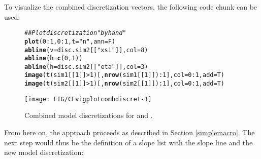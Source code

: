 \documentclass[article,nojss]{jss}\usepackage[]{graphicx}\usepackage[]{xcolor}
\makeatletter
\def\maxwidth{ %
  \ifdim\Gin@nat@width>\linewidth
    \linewidth
  \else
    \Gin@nat@width
  \fi
}
\newcommand{\hlnum}[1]{\textcolor[rgb]{0.686,0.059,0.569}{#1}}%
\newcommand{\hlsng}[1]{\textcolor[rgb]{0.192,0.494,0.8}{#1}}%
\newcommand{\hlcom}[1]{\textcolor[rgb]{0.678,0.584,0.686}{\textit{#1}}}%
\newcommand{\hlopt}[1]{\textcolor[rgb]{0,0,0}{#1}}%
\newcommand{\hldef}[1]{\textcolor[rgb]{0.345,0.345,0.345}{#1}}%
\newcommand{\hlkwc}[1]{\textcolor[rgb]{0.333,0.667,0.333}{#1}}%
\newcommand{\hlkwd}[1]{\textcolor[rgb]{0.737,0.353,0.396}{\textbf{#1}}}%
\newenvironment{kframe}{%
 \def\at@end@of@kframe{}%
 \ifinner\ifhmode%
  \def\at@end@of@kframe{\end{minipage}}%
  \begin{minipage}{\columnwidth}%
 \fi\fi%
 \def\FrameCommand##1{\hskip\@totalleftmargin \hskip-\fboxsep
 \colorbox{shadecolor}{##1}\hskip-\fboxsep
     \hskip-\linewidth \hskip-\@totalleftmargin \hskip\columnwidth}%
 \MakeFramed {\advance\hsize-\width
   \@totalleftmargin\z@ \linewidth\hsize
   \@setminipage}}%
 {\par\unskip\endMakeFramed%
 \at@end@of@kframe}
\newenvironment{knitrout}{}{} %
\makeatother
\begin{document}
To visualize the combined discretization vectors, the following code chunk can be used:

\begin{figure}[h]
\begin{center}
\begin{knitrout}
\color{fgcolor}\begin{kframe}
\begin{alltt}
 \hlcom{## Plot discretization "by hand"}
  \hlkwd{plot}\hldef{(}\hlnum{0}\hlopt{:}\hlnum{1}\hldef{,}\hlnum{0}\hlopt{:}\hlnum{1}\hldef{,}\hlkwc{t}\hldef{=}\hlsng{"n"}\hldef{,} \hlkwc{ann}\hldef{=F)}
   \hlkwd{abline}\hldef{(}\hlkwc{v}\hldef{=disc.sim2[[}\hlsng{"xsi"}\hldef{]],} \hlkwc{col}\hldef{=}\hlnum{8}\hldef{)}
   \hlkwd{abline}\hldef{(}\hlkwc{h} \hldef{=} \hlkwd{c}\hldef{(}\hlnum{0}\hldef{,}\hlnum{1}\hldef{) )}
   \hlkwd{abline}\hldef{(}\hlkwc{h}\hldef{= disc.sim2[[}\hlsng{"eta"}\hldef{]],} \hlkwc{col}\hldef{=}\hlnum{3}\hldef{)}
   \hlkwd{image}\hldef{(}\hlkwd{t}\hldef{(sim1[[}\hlnum{1}\hldef{]]}\hlopt{>}\hlnum{1}\hldef{)[,}\hlkwd{nrow}\hldef{(sim1[[}\hlnum{1}\hldef{]])}\hlopt{:}\hlnum{1}\hldef{],} \hlkwc{col}\hldef{=}\hlnum{0}\hlopt{:}\hlnum{1}\hldef{,} \hlkwc{add}\hldef{=T)}
   \hlkwd{image}\hldef{(}\hlkwd{t}\hldef{(sim2[[}\hlnum{1}\hldef{]]}\hlopt{>}\hlnum{1}\hldef{)[,}\hlkwd{nrow}\hldef{(sim2[[}\hlnum{1}\hldef{]])}\hlopt{:}\hlnum{1}\hldef{],} \hlkwc{col}\hldef{=}\hlnum{0}\hlopt{:}\hlnum{1}\hldef{,} \hlkwc{add}\hldef{=T)}
\end{alltt}
\end{kframe}
\texttt{[image: FIG/CFvigplotcombdiscret-1]} 
\end{knitrout}
\caption{\label{fig:combineddiscret} Combined model discretizations for  and .}
\end{center}
\end{figure}


From here on, the approach proceeds as described in Section \ref{simplemacro}.
The next step would thus be the definition of a slope list with the slope line and the new model discretization:
\end{document}
